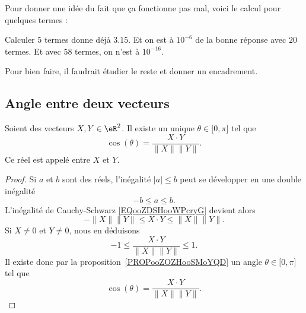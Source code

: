 Pour donner une idée du fait que ça fonctionne pas mal, voici le calcul pour quelques termes :

Calculer \( 5\) termes donne déjà \( 3.15\). Et on est à \( 10^{-6}\) de la bonne réponse avec \( 20\) termes. Et avec \( 58\) termes, on n'est à \( 10^{-16}\).

\begin{probleme}
	Pour bien faire, il faudrait étudier le reste et donner un encadrement.
\end{probleme}

\subsection{Angle entre deux vecteurs}

\begin{propositionDef} \label{DEFooSVDZooPWHwFQ}
	Soient des vecteurs \( X,Y\in \eR^2\). Il existe un unique \( \theta\in \mathopen[ 0 , \pi \mathclose]\) tel que
	\begin{equation}		\label{eqDefAngleVect}
		\cos(\theta)=\frac{ X\cdot Y }{ \| X \|\| Y \| }.
	\end{equation}
	Ce réel est appelé  entre \( X\) et \( Y\).
\end{propositionDef}

\begin{proof}
	Si \( a\) et \( b\) sont des réels, l'inégalité \( | a |\leq b\) peut se développer en une double inégalité
	\begin{equation}
		-b\leq a\leq b.
	\end{equation}
	L'inégalité de Cauchy-Schwarz \eqref{EQooZDSHooWPcryG} devient alors
	\begin{equation}
		-\| X \|\| Y \|\leq X\cdot Y\leq\| X \|\| Y \|.
	\end{equation}
	Si \( X\neq 0\) et \( Y\neq 0\), nous en déduisons
	\begin{equation}
		-1\leq\frac{ X\cdot Y }{ \| X \|\| Y \| }\leq 1.
	\end{equation}
	Il existe donc par la proposition~\ref{PROPooZOZHooSMoYQD} un angle \( \theta\in\mathopen[ 0 , \pi \mathclose]\) tel que
	\begin{equation}
		\cos(\theta)=\frac{ X\cdot Y }{ \| X \|\| Y \| }.
	\end{equation}
\end{proof}

